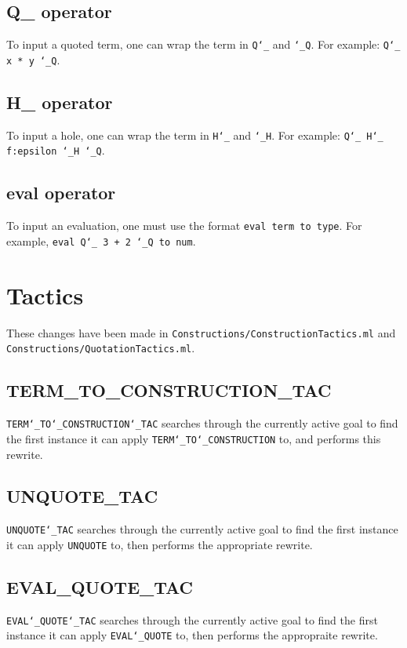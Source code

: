 \documentclass{article}
\def\c#1{\texttt{#1}}
\begin{document}
\subsection{Q\_ operator}
To input a quoted term, one can wrap the term in \c{Q\char`\_} and \c{\char`\_Q}. For example: \c{Q\char`\_ x * y \char`\_Q}.

\subsection{H\_ operator}
To input a hole, one can wrap the term in \c{H\char`\_} and \c{\char`\_H}. For example: \c{Q\char`\_ H\char`\_  f:epsilon \char`\_H \char`\_Q}.

\subsection{eval operator}
To input an evaluation, one must use the format \c{eval term to type}. For example, \c{eval Q\char`\_ 3 + 2 \char`\_Q to num}.

\section{Tactics}
These changes have been made in \c{Constructions/ConstructionTactics.ml} and \c{Constructions/QuotationTactics.ml}.

\subsection{TERM\_TO\_CONSTRUCTION\_TAC}
\c{TERM\char`\_TO\char`\_CONSTRUCTION\char`\_TAC} searches through the currently active goal to find the first instance it can apply \c{TERM\char`\_TO\char`\_CONSTRUCTION} to, and performs this rewrite.

\subsection{UNQUOTE\_TAC}
\c{UNQUOTE\char`\_TAC} searches through the currently active goal to find the first instance it can apply \c{UNQUOTE} to, then performs the appropriate rewrite.

\subsection{EVAL\_QUOTE\_TAC}
\c{EVAL\char`\_QUOTE\char`\_TAC} searches through the currently active goal to find the first instance it can apply \c{EVAL\char`\_QUOTE} to, then performs the appropraite rewrite.
\end{document}
